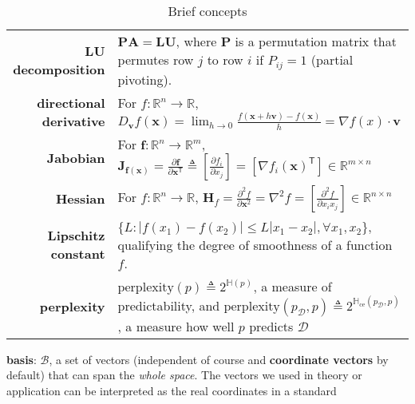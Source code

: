 \begin{table}[htpb]
\begin{tabular}{rp{24em}}
        \textbf{LU decomposition}                       & $\mathbf{PA}=\mathbf{LU}$, where $\mathbf{P}$ is a permutation matrix that permutes row $j$ to row $i$ if $P_{ij}=1$ (partial pivoting).\\
        \textbf{directional derivative}                 & {\footnotesize For $f:\mathbb{R}^n\to\mathbb{R}$, 
        $D_{\bm{v}}f(\bm{x})=\lim_{h\to 0}\frac{f(\bm{x}+h\bm{v})-f(\bm{x})}{h}=\nabla f(x)\cdot \bm{v}$} \\
        \textbf{Jabobian}                               & {\footnotesize For $\bm{f}:\mathbb{R}^n\to\mathbb{R}^m$,
        $\mathbf{J}_{\bm{f}(\bm{x})}
        = \frac{\partial{\bm{f}}}{\partial{\bm{x}^\mathsf{T}}}
        \triangleq\left[\frac{\partial{f_i}}{\partial{x_j}}\right]
        = \left[\nabla f_i(\bm{x})^\mathsf{T}\right]\in\mathbb{R}^{m\times n}$} \\
        \textbf{Hessian}                                & {\footnotesize For $f:\mathbb{R}^n\to\mathbb{R}$,
        $\mathbf{H}_f=\frac{\partial^2 f}{\partial\bm{x}^2}=\nabla^2 f=\left[\frac{\partial^2 f}{\partial x_ix_j}\right]\in\mathbb{R}^{n\times n}$}\\
        \textbf{Lipschitz constant}                     & $\{L:|f(x_1)-f(x_2)|\leq{L}|x_1-x_2|,\forall{x_1,x_2}\}$, qualifying the degree of smoothness of a function $f$. \\
        \textbf{perplexity}                             & $\text{perplexity}(p)\triangleq 2^{\mathbb{H}(p)}$, a measure of predictability, and $\text{perplexity}(p_\mathcal{D},p)\triangleq 2^{\mathbb{H}_\text{ce}(p_\mathcal{D},p)}$, a measure how well $p$ predicts $\mathcal{D}$ \\
        \bottomrule
    \end{tabular}
    \caption{Brief concepts}
    \label{tab:linalg}
\end{table}




\textbf{basis}:
$\mathcal{B}$, a set of vectors (independent of course and \textbf{coordinate vectors} by default) 
that can span the \textit{whole space}.
The vectors we used in theory or application can be interpreted as the real coordinates in a standard  



